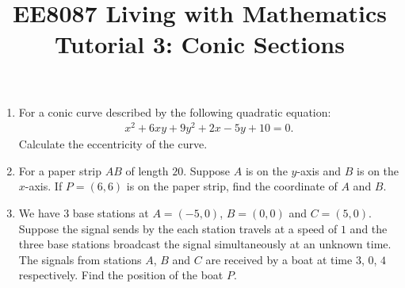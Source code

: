 \documentclass{article}
\title{EE8087 Living with Mathematics\\Tutorial 3: Conic Sections}
\date{}
\begin{document}
 \maketitle
\begin{enumerate}
\item For a conic curve described by the following quadratic equation:
  \begin{align*}
    x^2 + 6xy+9y^2 + 2x - 5y + 10=0. 
  \end{align*}
  Calculate the eccentricity of the curve.

\item For a paper strip $AB$ of length $20$. Suppose $A$ is on the $y$-axis and $B$ is on the $x$-axis. If $P = (6,6)$ is on the paper strip, find the coordinate of $A$ and $B$.
\begin{figure}[ht]
  \centering
\end{figure}

\item We have 3 base stations at $A = (-5,0)$, $B = (0,0)$ and $C = (5,0)$. Suppose the signal sends by the each station travels at a speed of $1$ and the three base stations broadcast the signal simultaneously at an unknown time. The signals from stations $A$, $B$ and $C$ are received by a boat at time $3$, $0$, $4$ respectively. Find the position of the boat $P$.

  \begin{figure}[ht]
    \centering
\end{figure}
\end{enumerate}
\end{document}
